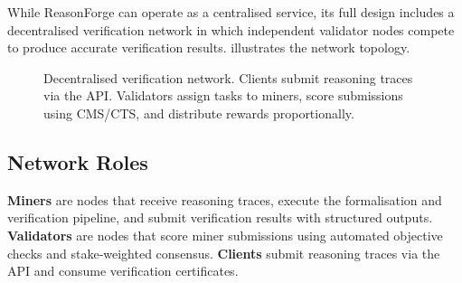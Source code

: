 \documentclass[11pt,a4paper]{article}
\begin{document}
While ReasonForge can operate as a centralised service, its full design
includes a decentralised verification network in which independent
validator nodes compete to produce accurate verification results.
 illustrates the network topology.

\begin{figure}[t]
\centering
{}
\caption{Decentralised verification network.  Clients submit reasoning
  traces via the API.  Validators assign tasks to miners, score
  submissions using CMS/CTS, and distribute rewards proportionally.}
\label{fig:network}
\end{figure}

\subsection{Network Roles}

\textbf{Miners} are nodes that receive reasoning traces, execute the
formalisation and verification pipeline, and submit verification results
with structured outputs.  \textbf{Validators} are nodes that score miner
submissions using automated objective checks and stake-weighted
consensus.  \textbf{Clients} submit reasoning traces via the API and
consume verification certificates.
\end{document}
